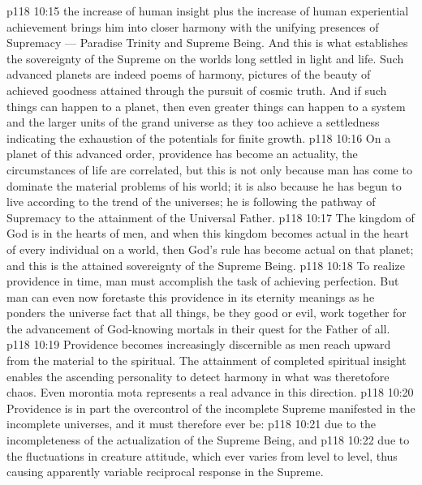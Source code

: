 \vs p118 10:15 \pc {}\bibnobreakspace {} the increase of human insight plus the increase of human experiential achievement brings him into closer harmony with the unifying presences of Supremacy --- Paradise Trinity and Supreme Being. And this is what establishes the sovereignty of the Supreme on the worlds long settled in light and life. Such advanced planets are indeed poems of harmony, pictures of the beauty of achieved goodness attained through the pursuit of cosmic truth. And if such things can happen to a planet, then even greater things can happen to a system and the larger units of the grand universe as they too achieve a settledness indicating the exhaustion of the potentials for finite growth.
\vs p118 10:16 \pc On a planet of this advanced order, providence has become an actuality, the circumstances of life are correlated, but this is not only because man has come to dominate the material problems of his world; it is also because he has begun to live according to the trend of the universes; he is following the pathway of Supremacy to the attainment of the Universal Father.
\vs p118 10:17 \pc The kingdom of God is in the hearts of men, and when this kingdom becomes actual in the heart of every individual on a world, then God’s rule has become actual on that planet; and this is the attained sovereignty of the Supreme Being.
\vs p118 10:18 To realize providence in time, man must accomplish the task of achieving perfection. But man can even now foretaste this providence in its eternity meanings as he ponders the universe fact that all things, be they good or evil, work together for the advancement of God\hyp{}knowing mortals in their quest for the Father of all.
\vs p118 10:19 \pc Providence becomes increasingly discernible as men reach upward from the material to the spiritual. The attainment of completed spiritual insight enables the ascending personality to detect harmony in what was theretofore chaos. Even morontia mota represents a real advance in this direction.
\vs p118 10:20 Providence is in part the overcontrol of the incomplete Supreme manifested in the incomplete universes, and it must therefore ever be:
\vs p118 10:21 \bibnobreakspace {} due to the incompleteness of the actualization of the Supreme Being, and
\vs p118 10:22 \bibnobreakspace {} due to the fluctuations in creature attitude, which ever varies from level to level, thus causing apparently variable reciprocal response in the Supreme.
